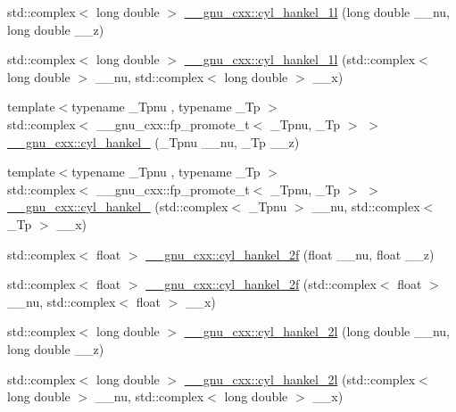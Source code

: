 \begin{DoxyCompactItemize}
\item 
std\+::complex$<$ long double $>$ \hyperlink{group__gnu__math__spec__func_gacb49c66b4267fbc56906db02f14365f2}{\+\_\+\+\_\+gnu\+\_\+cxx\+::cyl\+\_\+hankel\+\_\+1l} (long double \+\_\+\+\_\+nu, long double \+\_\+\+\_\+z)
\item 
std\+::complex$<$ long double $>$ \hyperlink{group__gnu__math__spec__func_ga6900f79ec70673bcb001538aec74e07c}{\+\_\+\+\_\+gnu\+\_\+cxx\+::cyl\+\_\+hankel\+\_\+1l} (std\+::complex$<$ long double $>$ \+\_\+\+\_\+nu, std\+::complex$<$ long double $>$ \+\_\+\+\_\+x)
\item 
{\footnotesize template$<$typename \+\_\+\+Tpnu , typename \+\_\+\+Tp $>$ }\\std\+::complex$<$ \+\_\+\+\_\+gnu\+\_\+cxx\+::fp\+\_\+promote\+\_\+t$<$ \+\_\+\+Tpnu, \+\_\+\+Tp $>$ $>$ \hyperlink{group__gnu__math__spec__func_ga7ebc71dd48ac97255d72f5f5f43dfd8e}{\+\_\+\+\_\+gnu\+\_\+cxx\+::cyl\+\_\+hankel\+\_} (\+\_\+\+Tpnu \+\_\+\+\_\+nu, \+\_\+\+Tp \+\_\+\+\_\+z)
\item 
{\footnotesize template$<$typename \+\_\+\+Tpnu , typename \+\_\+\+Tp $>$ }\\std\+::complex$<$ \+\_\+\+\_\+gnu\+\_\+cxx\+::fp\+\_\+promote\+\_\+t$<$ \+\_\+\+Tpnu, \+\_\+\+Tp $>$ $>$ \hyperlink{group__gnu__math__spec__func_ga326764c0d2dca072c411573503968e50}{\+\_\+\+\_\+gnu\+\_\+cxx\+::cyl\+\_\+hankel\+\_} (std\+::complex$<$ \+\_\+\+Tpnu $>$ \+\_\+\+\_\+nu, std\+::complex$<$ \+\_\+\+Tp $>$ \+\_\+\+\_\+x)
\item 
std\+::complex$<$ float $>$ \hyperlink{group__gnu__math__spec__func_ga2b75361870975c47d57bed71b4064ce7}{\+\_\+\+\_\+gnu\+\_\+cxx\+::cyl\+\_\+hankel\+\_\+2f} (float \+\_\+\+\_\+nu, float \+\_\+\+\_\+z)
\item 
std\+::complex$<$ float $>$ \hyperlink{group__gnu__math__spec__func_gae21f9d09b937eaf9729982da5a382f20}{\+\_\+\+\_\+gnu\+\_\+cxx\+::cyl\+\_\+hankel\+\_\+2f} (std\+::complex$<$ float $>$ \+\_\+\+\_\+nu, std\+::complex$<$ float $>$ \+\_\+\+\_\+x)
\item 
std\+::complex$<$ long double $>$ \hyperlink{group__gnu__math__spec__func_ga4babb91ca6906f237e8bd1f0f1a10509}{\+\_\+\+\_\+gnu\+\_\+cxx\+::cyl\+\_\+hankel\+\_\+2l} (long double \+\_\+\+\_\+nu, long double \+\_\+\+\_\+z)
\item 
std\+::complex$<$ long double $>$ \hyperlink{group__gnu__math__spec__func_ga1ac6434925254bd02e108f5a4e52b34d}{\+\_\+\+\_\+gnu\+\_\+cxx\+::cyl\+\_\+hankel\+\_\+2l} (std\+::complex$<$ long double $>$ \+\_\+\+\_\+nu, std\+::complex$<$ long double $>$ \+\_\+\+\_\+x)

\end{DoxyCompactItemize}

